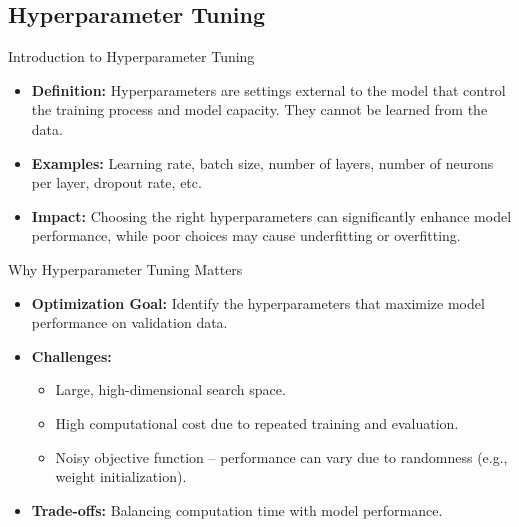\documentclass[serif, aspectratio=169]{beamer}
\begin{document}
\subsection{Hyperparameter Tuning}

\begin{frame}{Introduction to Hyperparameter Tuning}
    \begin{itemize}
        \item \textbf{Definition:} Hyperparameters are settings external to the model that control the training process and model capacity. They cannot be learned from the data.
        \item \textbf{Examples:} Learning rate, batch size, number of layers, number of neurons per layer, dropout rate, etc.
        \item \textbf{Impact:} Choosing the right hyperparameters can significantly enhance model performance, while poor choices may cause underfitting or overfitting.
    \end{itemize}
\end{frame}


\begin{frame}{Why Hyperparameter Tuning Matters}
    \begin{itemize}
        \item \textbf{Optimization Goal:} Identify the hyperparameters that maximize model performance on validation data.
        \item \textbf{Challenges:}
            \begin{itemize}
                \item Large, high-dimensional search space.
                \item High computational cost due to repeated training and evaluation.
                \item Noisy objective function – performance can vary due to randomness (e.g., weight initialization).
            \end{itemize}
        \item \textbf{Trade-offs:} Balancing computation time with model performance.
    \end{itemize}
\end{frame}
\end{document}
